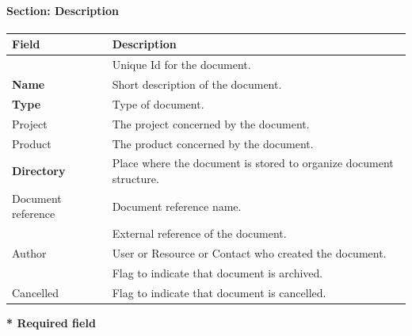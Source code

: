 \documentclass[letterpaper,10pt,english]{sphinxmanual}
\begin{document}
\paragraph{Section: Description}

\begin{tabulary}{\linewidth}{|l|l|}
\hline
\textsf{\relax 
Field
} & \textsf{\relax 
Description
}\\
\hline
{\hyperref[Glossary:term-id]{\emph{}}}
 & 
Unique Id for the document.
\\
\hline
\textbf{Name}
 & 
Short description of the document.
\\
\hline
\textbf{Type}
 & 
Type of document.
\\
\hline
Project
 & 
The project concerned by the document.
\\
\hline
Product
 & 
The product concerned by the document.
\\
\hline
\textbf{Directory}
 & 
Place where the document is stored  to organize document structure.
\\
\hline
Document reference
 & 
Document reference name.
\\
\hline
{\hyperref[Glossary:term-external-reference]{\emph{}}}
 & 
External reference of the document.
\\
\hline
Author
 & 
User or Resource or Contact who created the document.
\\
\hline
{\hyperref[Glossary:term-closed]{\emph{}}}
 & 
Flag to indicate that document is archived.
\\
\hline
Cancelled
 & 
Flag to indicate that document is cancelled.
\\
\hline\end{tabulary}


\textbf{* Required field}
\end{document}
